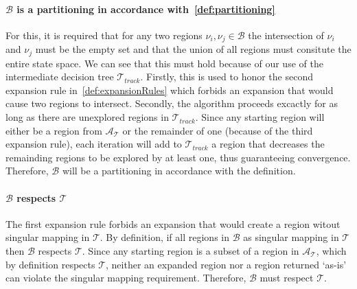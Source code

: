 \paragraph{$\mathcal{B}$ is a partitioning in accordance
with~\cref{def:partitioning}} For this, it is required that for any two regions
$\nu_{i}, \nu_{j} \in \mathcal{B}$ the intersection of $\nu_{i}$ and $\nu_{j}$
must be the empty set and that the union of all regions must consitute the
entire state space. We can see that this must hold because of our use of the
intermediate decision tree $\mathcal{T}_{track}$. Firstly, this is used to honor
the second expansion rule in~\cref{def:expansionRules} which forbids an
expansion that would cause two regions to intersect. Secondly, the algorithm
proceeds excactly for as long as there are unexplored regions in
$\mathcal{T}_{track}$. Since any starting region will either be a region from
$\mathcal{A}_{\mathcal{T}}$ or the remainder of one (because of the third
expansion rule), each iteration will add to $\mathcal{T}_{track}$ a region that
decreases the remainding regions to be explored by at least one, thus
guaranteeing convergence. Therefore, $\mathcal{B}$ will be a partitioning in
accordance with the definition.

\paragraph{$\mathcal{B}$ respects $\mathcal{T}$} The first expansion rule
forbids an expansion that would create a region witout singular mapping in
$\mathcal{T}$. By definition, if all regions in $\mathcal{B}$ as singular
mapping in $\mathcal{T}$ then $\mathcal{B}$ respects $\mathcal{T}$. Since any
starting region is a subset of a region in $\mathcal{A}_{\mathcal{T}}$, which by
definition respects $\mathcal{T}$, neither an expanded region nor a region
returned `as-is' can violate the singular mapping requirement. Therefore,
$\mathcal{B}$ must respect $\mathcal{T}$.

